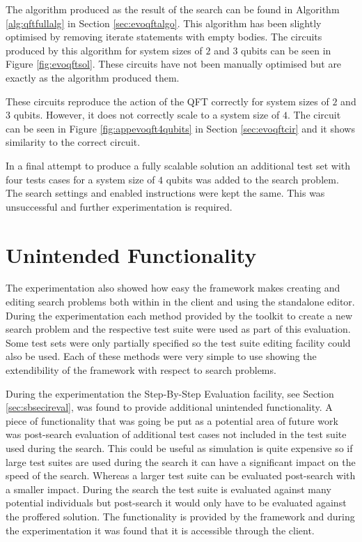 The algorithm produced as the result of the search can be found in Algorithm \ref{alg:qftfullalg} in Section \ref{sec:evoqftalgo}.
This algorithm has been slightly optimised by removing iterate statements with empty bodies.
The circuits produced by this algorithm for system sizes of $2$ and $3$ qubits can be seen in Figure \ref{fig:evoqftsol}.
These circuits have not been manually optimised but are exactly as the algorithm produced them.

These circuits reproduce the action of the QFT correctly for system sizes of $2$ and $3$ qubits.
However, it does not correctly scale to a system size of $4$.
The circuit can be seen in Figure \ref{fig:appevoqft4qubits} in Section \ref{sec:evoqftcir} and it shows similarity to the correct circuit.

In a final attempt to produce a fully scalable solution an additional test set with four tests cases for a system size of $4$ qubits was added to the search problem.
The search settings and enabled instructions were kept the same.
This was unsuccessful and further experimentation is required.




\section{Unintended Functionality}

The experimentation also showed how easy the framework makes creating and editing search problems both within in the client and using the standalone editor.
During the experimentation each method provided by the toolkit to create a new search problem and the respective test suite were used as part of this evaluation.
Some test sets were only partially specified so the test suite editing facility could also be used.
Each of these methods were very simple to use showing the extendibility of the framework with respect to search problems.

During the experimentation the Step-By-Step Evaluation facility, see Section \ref{sec:sbsecireval}, was found to provide additional unintended functionality.
A piece of functionality that was going be put as a potential area of future work was post-search evaluation of additional test cases not included in the test suite used during the search.
This could be useful as simulation is quite expensive so if large test suites are used during the search it can have a significant impact on the speed of the search.
Whereas a larger test suite can be evaluated post-search with a smaller impact.
During the search the test suite is evaluated against many potential individuals but post-search it would only have to be evaluated against the proffered solution.
The functionality is provided by the framework and during the experimentation it was found that it is accessible through the client.


